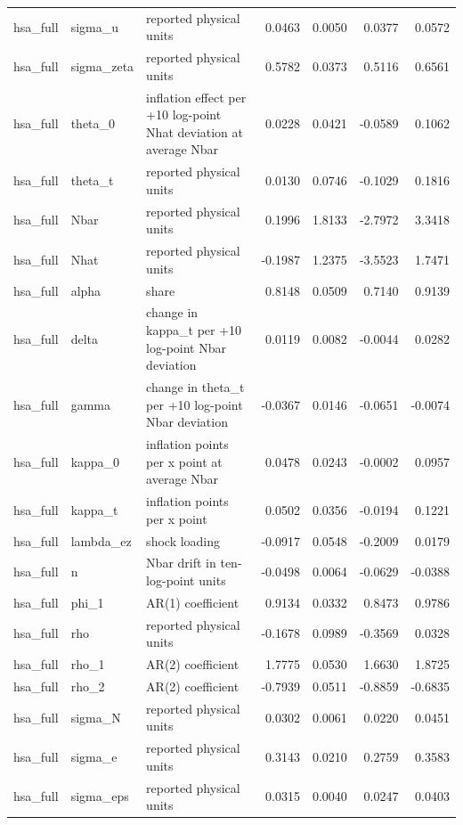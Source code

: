 \begin{tabular}{lllrrrr}
hsa\_full & sigma\_u & reported physical units & 0.0463 & 0.0050 & 0.0377 & 0.0572 \\
hsa\_full & sigma\_zeta & reported physical units & 0.5782 & 0.0373 & 0.5116 & 0.6561 \\
hsa\_full & theta\_0 & inflation effect per +10 log-point Nhat deviation at average Nbar & 0.0228 & 0.0421 & -0.0589 & 0.1062 \\
hsa\_full & theta\_t & reported physical units & 0.0130 & 0.0746 & -0.1029 & 0.1816 \\
hsa\_full & Nbar & reported physical units & 0.1996 & 1.8133 & -2.7972 & 3.3418 \\
hsa\_full & Nhat & reported physical units & -0.1987 & 1.2375 & -3.5523 & 1.7471 \\
hsa\_full & alpha & share & 0.8148 & 0.0509 & 0.7140 & 0.9139 \\
hsa\_full & delta & change in kappa\_t per +10 log-point Nbar deviation & 0.0119 & 0.0082 & -0.0044 & 0.0282 \\
hsa\_full & gamma & change in theta\_t per +10 log-point Nbar deviation & -0.0367 & 0.0146 & -0.0651 & -0.0074 \\
hsa\_full & kappa\_0 & inflation points per x point at average Nbar & 0.0478 & 0.0243 & -0.0002 & 0.0957 \\
hsa\_full & kappa\_t & inflation points per x point & 0.0502 & 0.0356 & -0.0194 & 0.1221 \\
hsa\_full & lambda\_ez & shock loading & -0.0917 & 0.0548 & -0.2009 & 0.0179 \\
hsa\_full & n & Nbar drift in ten-log-point units & -0.0498 & 0.0064 & -0.0629 & -0.0388 \\
hsa\_full & phi\_1 & AR(1) coefficient & 0.9134 & 0.0332 & 0.8473 & 0.9786 \\
hsa\_full & rho & reported physical units & -0.1678 & 0.0989 & -0.3569 & 0.0328 \\
hsa\_full & rho\_1 & AR(2) coefficient & 1.7775 & 0.0530 & 1.6630 & 1.8725 \\
hsa\_full & rho\_2 & AR(2) coefficient & -0.7939 & 0.0511 & -0.8859 & -0.6835 \\
hsa\_full & sigma\_N & reported physical units & 0.0302 & 0.0061 & 0.0220 & 0.0451 \\
hsa\_full & sigma\_e & reported physical units & 0.3143 & 0.0210 & 0.2759 & 0.3583 \\
hsa\_full & sigma\_eps & reported physical units & 0.0315 & 0.0040 & 0.0247 & 0.0403 \\

\end{tabular}
